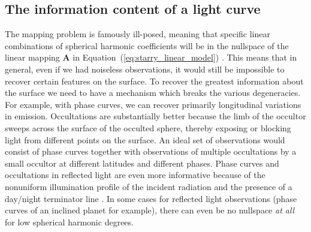 \documentclass[12pt,dvipsnames]{report}
\begin{document}
\subsection{The information content of a light curve}
\label{ssec:information_content}
The mapping problem is famously ill-posed, meaning that specific linear combinations of 
spherical harmonic coefficients will be in the nullspace of the linear mapping  
$\mathbf{A}$ in Equation~(\ref{eq:starry_linear_model}) \citep{2021AJ....162..123L}.
This means that in general, even if we had noiseless observations, it would still be impossible to recover certain features on the surface.
To recover the greatest information about the surface we need to have a mechanism which breaks the various degeneracies.
For example, with phase curves, we can recover primarily longitudinal variations in emission.
Occultations are substantially better because the limb of the occultor sweeps across the surface of the occulted sphere, thereby exposing or blocking light from different points on the surface.
An ideal set of observations would consist of phase curves together with observations of multiple occultations by a small occultor at different latitudes and different phases.
Phase curves and occultations in reflected light are even more informative because of the 
nonuniform illumination profile of the incident radiation and the presence of a day/night 
terminator line \citep{2022AJ....164....4L}.
In some cases for reflected light observations (phase curves of an inclined planet for example), 
there can even be no nullspace \emph{at all} for low spherical harmonic degrees.
\end{document}
